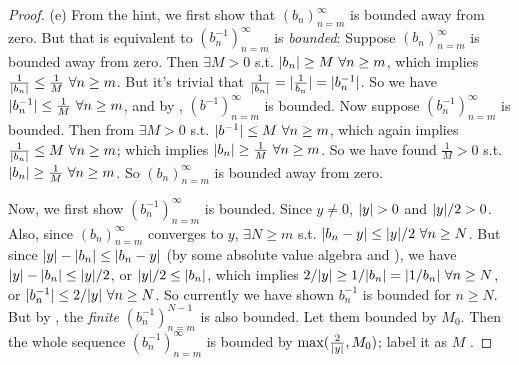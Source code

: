 \begin{proof} (e)
From the hint, we first show that \((b_n)_{n = m}^{\infty}\) is bounded away from zero.
But that is equivalent to \((b_n^{-1})_{n = m}^{\infty}\) is \emph{bounded}:
Suppose \((b_n)_{n = m}^{\infty}\) is bounded away from zero.
Then \(\exists M > 0\) s.t. \(\lvert b_n\rvert \ge M\ \forall n \ge m\), which implies \(\frac1{\lvert b_n\rvert} \le \frac1{M}\ \forall n \ge m\).
But it's trivial that \(\frac1{\lvert b_n\rvert} = \lvert\frac1{b_n}\rvert = \lvert b_n^{-1}\rvert\).
So we have \(\lvert b_n^{-1}\rvert \le \frac1{M}\ \forall n \ge m\), and by , \((b^{-1})_{n = m}^{\infty}\) is bounded.
Now suppose \((b_n^{-1})_{n = m}^{\infty}\) is bounded.
Then from  \(\exists M > 0\) s.t. \(\lvert b^{-1}\rvert \le M\ \forall n \ge m\), which again implies \(\frac1{\lvert b_n\rvert} \le M\ \forall n \ge m\);
which implies \(\abs{b_n} \ge \frac1{M}\ \forall n \ge m\).
So we have found \(\frac1{M} > 0\) s.t. \(\abs{b_n} \ge \frac1{M}\ \forall n \ge m\). So \((b_n)_{n = m}^{\infty}\) is bounded away from zero.

Now, we first show \((b_n^{-1})_{n = m}^{\infty}\) is bounded.
Since \(y \neq 0\), \(\lvert y\rvert > 0\) and \(\lvert y\rvert/2 > 0\).
Also, since \((b_n)_{n = m}^{\infty}\) converges to \(y\), \(\exists N \ge m\) s.t. \(\lvert b_n - y\rvert \le \lvert y\rvert/2\ \forall n \ge N\).
But since \(\lvert y\rvert - \lvert b_n\rvert \le \lvert b_n - y\rvert\) (by some absolute value algebra and ), we have \(\lvert y\rvert - \lvert b_n\rvert \le \lvert y\rvert/2\),
or \(\lvert y\rvert/2 \le \lvert b_n\rvert\), which implies \(2/\lvert y\rvert \ge 1/\lvert b_n\rvert = \lvert1/b_n\rvert\ \forall n \ge N\), or \(\lvert b_n^{-1}\rvert \le 2/\lvert y\rvert\ \forall n \ge N\).
So currently we have shown \(b_n^{-1}\) is bounded for \(n \ge N\).
But by , the \emph{finite} \((b_n^{-1})_{n = m}^{N - 1}\) is also bounded.
Let them bounded by \(M_0\).
Then the whole sequence \((b_n^{-1})_{n = m}^{\infty}\) is bounded by \(\max(\frac{2}{\lvert y\rvert}, M_0)\); label it as \(M\) \MAROON{(*)}.


\end{proof}
